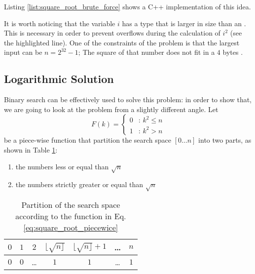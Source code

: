 Listing \ref{list:square_root_brute_force} shows a C++ implementation of this idea.




It is worth noticing that the variable $i$ has a type that is larger in size than an
. This is necessary in order to prevent overflows during the calculation of $i^2$ (see the highlighted line).
One of the constraints of the problem is that the largest input can be $n=2^{32}-1$; The square of that number does not fit in a $4$ bytes .
	
	


\subsection{Logarithmic Solution}
Binary search can be effectively used to solve this problem: in order to show that, we are going
to look at the problem from a slightly different angle. 
Let 
\begin{equation}
	F(k)=\begin{cases} 
	0 & \text{: } k^2 \leq n \\
	1 & \text{:  } k^2 > n
\end{cases}
\label{eq:square_root_piecewice}
\end{equation} 
be a piece-wise function that partition the search space $[0\ldots n]$ into two parts, as shown in Table
\ref{tab:sqrt_split_space}:
	\begin{enumerate}
      \item the numbers  less or equal than $\sqrt{n}$
      \item the numbers strictly greater or equal than $\sqrt{n}$
	\end{enumerate}


\begin{table}
	\centering
	\begin{tabular}{|c|c|c|c|c|c|c|}
		\hline
		$0$ & $1$ & $2$   & $\lfloor \sqrt{n \rfloor}$ & $\lfloor \sqrt{n \rfloor}+1$ & \ldots   & $n$ \\ \hline
		$0$ & $0$ & \ldots & $1$ & $1$ & \ldots & $1$   \\ \hline
	\end{tabular}
	\caption{Partition of the search space according to the function in Eq.
	\ref{eq:square_root_piecewice}}
	\label{tab:sqrt_split_space}
\end{table}

